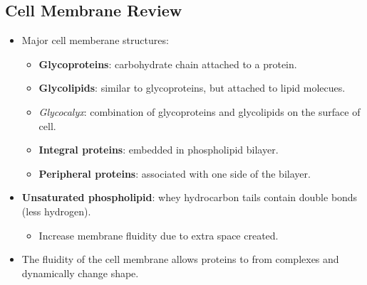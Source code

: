 \documentclass[12pt,a4paper]{article}
\begin{document}
\subsection{Cell Membrane Review}
\begin{itemize}
    \item Major cell memberane structures:
        \begin{itemize}
            \item \textbf{Glycoproteins}: carbohydrate chain attached to a protein.
            \item \textbf{Glycolipids}: similar to glycoproteins, but attached to lipid molecues.
            \item \textit{Glycocalyx}: combination of glycoproteins and glycolipids on the surface of cell.
            \item \textbf{Integral proteins}: embedded in phospholipid bilayer.
            \item \textbf{Peripheral proteins}: associated with one side of the bilayer.
        \end{itemize}
    \item \textbf{Unsaturated phospholipid}: whey hydrocarbon tails contain double bonds (less hydrogen).
        \begin{itemize}
            \item Increase membrane fluidity due to extra space created.
        \end{itemize}
    \item The fluidity of the cell membrane allows proteins to from complexes and dynamically change shape.
\end{itemize}
\end{document}
